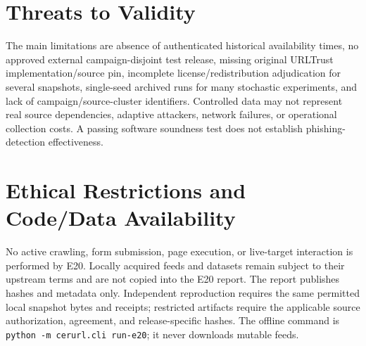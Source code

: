 \section{Threats to Validity}
The main limitations are absence of authenticated historical availability times, no approved external campaign-disjoint test release, missing original URLTrust implementation/source pin, incomplete license/redistribution adjudication for several snapshots, single-seed archived runs for many stochastic experiments, and lack of campaign/source-cluster identifiers. Controlled data may not represent real source dependencies, adaptive attackers, network failures, or operational collection costs. A passing software soundness test does not establish phishing-detection effectiveness.

\section{Ethical Restrictions and Code/Data Availability}
No active crawling, form submission, page execution, or live-target interaction is performed by E20. Locally acquired feeds and datasets remain subject to their upstream terms and are not copied into the E20 report. The report publishes hashes and metadata only. Independent reproduction requires the same permitted local snapshot bytes and receipts; restricted artifacts require the applicable source authorization, agreement, and release-specific hashes. The offline command is \texttt{python -m cerurl.cli run-e20}; it never downloads mutable feeds.
